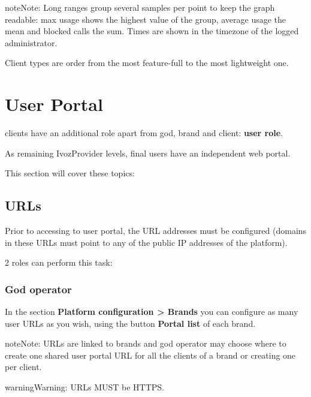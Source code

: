 \documentclass[letterpaper,10pt,english]{sphinxmanual}
\begin{document}
\begin{notice}{note}{Note:}
Long ranges group several samples per point to keep the graph readable: max usage shows the highest value
of the group, average usage the mean and blocked calls the sum. Times are shown in the timezone of the
logged administrator.
\end{notice}

Client types are order from the most feature-full to the most lightweight one.


\chapter{User Portal}
\label{user_portal/index:userportal}\label{user_portal/index:user-portal}\label{user_portal/index::doc}
{\hyperref[administration_portal/brand/clients/virtual_pbx:virtual\string-pbx]{}} clients have an additional role apart from god, brand and client: \textbf{user role}.

As remaining IvozProvider levels, final users have an independent web portal.

This section will cover these topics:


\section{URLs}
\label{user_portal/urls::doc}\label{user_portal/urls:urls}
Prior to accessing to user portal, the URL addresses must be configured (domains
in these URLs must point to any of the public IP addresses of the platform).

2 roles can perform this task:


\subsection{God operator}
\label{user_portal/urls:god-operator}
In the section \textbf{Platform configuration \textgreater{} Brands} you can configure as many
user URLs as you wish, using the button \textbf{Portal list} of each brand.

\begin{notice}{note}{Note:}
URLs are linked to brands and god operator may choose where to create
one shared user portal URL for all the clients of a brand or creating
one per client.
\end{notice}

\begin{notice}{warning}{Warning:}
URLs MUST be HTTPS.
\end{notice}
\end{document}

